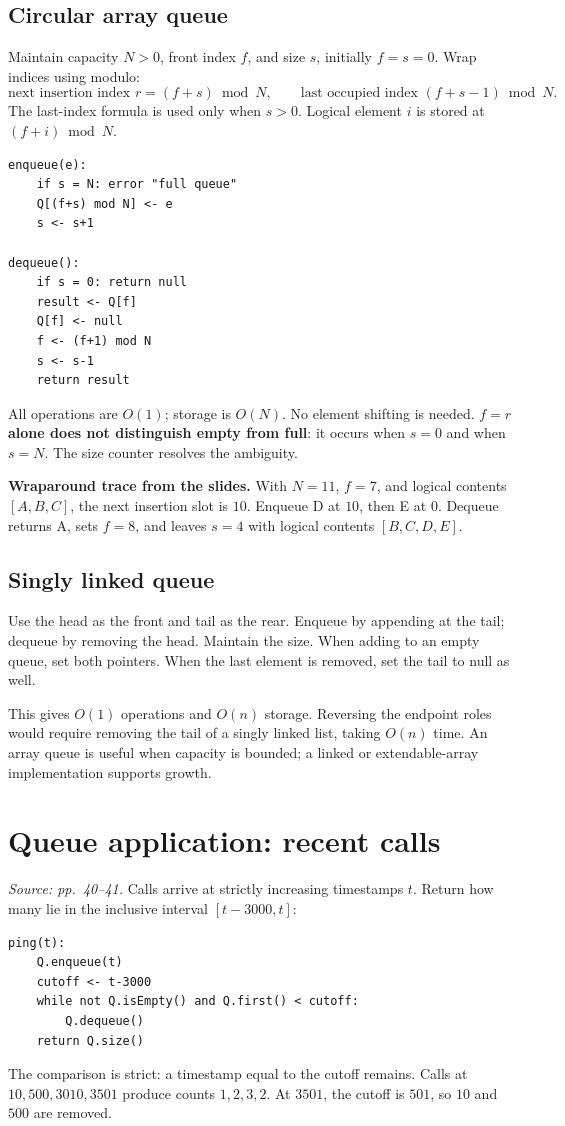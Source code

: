 \documentclass[11pt]{article}
\begin{document}
\subsection{Circular array queue}
Maintain capacity $N>0$, front index $f$, and size $s$, initially $f=s=0$. Wrap indices using modulo:
\[
\text{next insertion index }r=(f+s)\bmod N,
\qquad\text{last occupied index }(f+s-1)\bmod N.
\]
The last-index formula is used only when $s>0$. Logical element $i$ is stored at $(f+i)\bmod N$.
\begin{lstlisting}
enqueue(e):
    if s = N: error "full queue"
    Q[(f+s) mod N] <- e
    s <- s+1

dequeue():
    if s = 0: return null
    result <- Q[f]
    Q[f] <- null
    f <- (f+1) mod N
    s <- s-1
    return result
\end{lstlisting}
All operations are $O(1)$; storage is $O(N)$. No element shifting is needed. \textbf{$f=r$ alone does not distinguish empty from full}: it occurs when $s=0$ and when $s=N$. The size counter resolves the ambiguity.

\textbf{Wraparound trace from the slides.} With $N=11$, $f=7$, and logical contents $[A,B,C]$, the next insertion slot is $10$. Enqueue D at $10$, then E at $0$. Dequeue returns A, sets $f=8$, and leaves $s=4$ with logical contents $[B,C,D,E]$.

\subsection{Singly linked queue}
Use the head as the front and tail as the rear. Enqueue by appending at the tail; dequeue by removing the head. Maintain the size. When adding to an empty queue, set both pointers. When the last element is removed, set the tail to null as well.

This gives $O(1)$ operations and $O(n)$ storage. Reversing the endpoint roles would require removing the tail of a singly linked list, taking $O(n)$ time. An array queue is useful when capacity is bounded; a linked or extendable-array implementation supports growth.

\section{Queue application: recent calls}
\textit{Source: pp.\ 40--41.}
Calls arrive at strictly increasing timestamps $t$. Return how many lie in the inclusive interval $[t-3000,t]$:
\begin{lstlisting}
ping(t):
    Q.enqueue(t)
    cutoff <- t-3000
    while not Q.isEmpty() and Q.first() < cutoff:
        Q.dequeue()
    return Q.size()
\end{lstlisting}
The comparison is strict: a timestamp equal to the cutoff remains. Calls at $10,500,3010,3501$ produce counts $1,2,3,2$. At $3501$, the cutoff is $501$, so $10$ and $500$ are removed.
\end{document}
